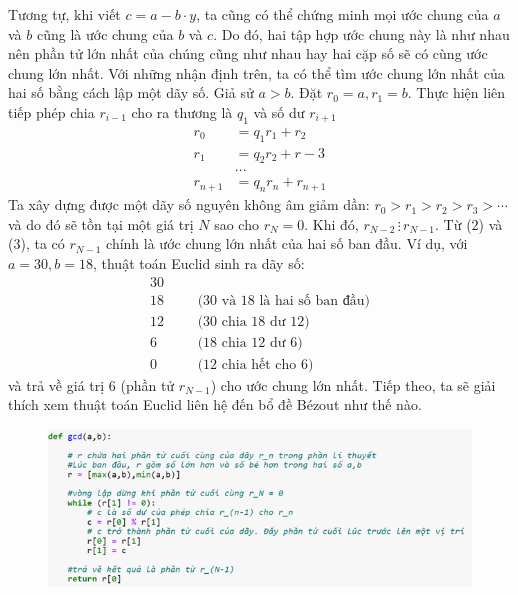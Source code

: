 \begin{multicols}{2}
	\vskip 0.1cm
	Tương tự, khi viết $c=a-b\cdot y$, ta cũng có thể chứng minh mọi ước chung của $a$ và $b$ cũng là ước chung của $b$ và $c$. 
	\vskip 0.1cm
	Do đó, hai tập hợp ước chung này là như nhau nên phần tử lớn nhất của chúng cũng như nhau hay hai cặp số sẽ có cùng ước chung lớn nhất.
	\vskip 0.1cm
	Với những nhận định trên, ta có thể tìm ước chung lớn nhất của hai số bằng cách lập một dãy số. Giả sử $a>b$. Đặt $r_0=a,r_1=b$. Thực hiện liên tiếp phép chia $r_{i-1}$ cho ra thương là $q_1$ và số dư $r_{i+1}$
	\setlength{\abovedisplayskip}{5pt}
	\setlength{\belowdisplayskip}{5pt}
	\begin{align*}
		r_0 &= q_1r_1 + r_2\\
		r_1 &= q_2r_2 + r-3\\
		&\ldots\\
		r_{n+1} &= q_nr_n + r_{n+1}
	\end{align*}
	Ta xây dựng được một dãy số nguyên không âm giảm dần: $r_0>r_1>r_2>r_3>\cdots$ và do đó sẽ tồn tại một giá trị $N$ sao cho $r_N=0$. Khi đó, $r_{N-2}\,\vdots\,r_{N-1}$. Từ ($2$) và ($3$), ta có $r_{N-1}$ chính là ước chung lớn nhất của hai số ban đầu.
	\vskip 0.1cm
	Ví dụ, với $a=30,b=18$, thuật toán Euclid sinh ra dãy số:
	\begin{align*}
		30&	&&\\
		18&	&&\text{($30$ và $18$ là hai số ban đầu)}\\	
		12&	&&\text{($30$ chia $18$ dư $12$)}\\
		6&	&&\text{($18$ chia $12$ dư $6$)}\\
		0&	&&\text{($12$ chia hết cho $6$)}
	\end{align*}
	và trả về giá trị $6$ (phần tử $r_{N-1}$) cho ước chung lớn nhất.
	\vskip 0.1cm
	Tiếp theo, ta sẽ giải thích xem thuật toán Euclid liên hệ đến bổ đề Bézout như thế nào. 
	\end{multicols}
	\begin{figure}[H]
		\centering
		\vspace*{5pt}
		\captionsetup{labelformat= empty, justification=centering}
		\includegraphics[width=1\linewidth]{2}
		\vspace*{-15pt}
	\end{figure}
